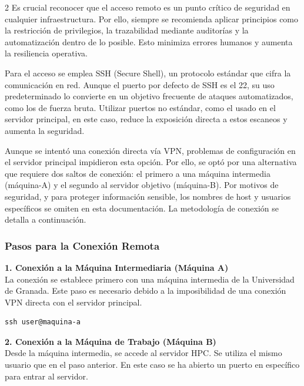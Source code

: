\begin{multicols*}{2}
    Es crucial reconocer que el acceso remoto es un punto crítico de seguridad en cualquier infraestructura. Por ello, siempre se recomienda aplicar principios como la restricción de privilegios, la trazabilidad mediante auditorías y la automatización dentro de lo posible. Esto minimiza errores humanos y aumenta la resiliencia operativa.

Para el acceso se emplea SSH (Secure Shell), un protocolo estándar que cifra la comunicación en red. Aunque el puerto por defecto de SSH es el 22, su uso predeterminado lo convierte en un objetivo frecuente de ataques automatizados, como los de fuerza bruta. Utilizar puertos no estándar, como el usado en el servidor principal, en este caso, reduce la exposición directa a estos escaneos y aumenta la seguridad.

Aunque se intentó una conexión directa vía VPN, problemas de configuración en el servidor principal impidieron esta opción. Por ello, se optó por una alternativa que requiere dos saltos de conexión: el primero a una máquina intermedia (máquina-A) y el segundo al servidor objetivo (máquina-B). Por motivos de seguridad, y para proteger información sensible, los nombres de host y usuarios específicos se omiten en esta documentación. La metodología de conexión se detalla a continuación.

\subsubsection*{Pasos para la Conexión Remota}

\noindent\textbf{1. Conexión a la Máquina Intermediaria (Máquina A)}\\
La conexión se establece primero con una máquina intermedia de la Universidad de Granada. Este paso es necesario debido a la imposibilidad de una conexión VPN directa con el servidor principal.

\begin{center}
\begin{minipage}{0.95\linewidth}
\begin{verbatim}
ssh user@maquina-a
\end{verbatim}
\end{minipage}
\end{center}


\noindent\textbf{2. Conexión a la Máquina de Trabajo (Máquina B)}\\
Desde la máquina intermedia, se accede al servidor HPC. Se utiliza el mismo usuario que en el paso anterior. En este caso se ha abierto un puerto en específico para entrar al servidor.


\end{multicols*}
